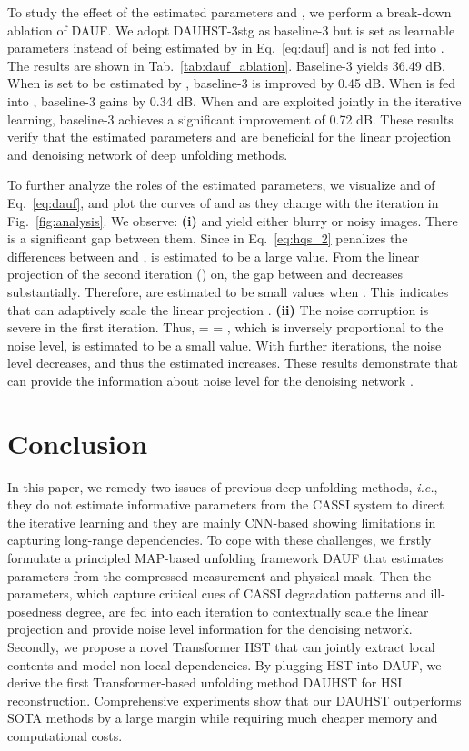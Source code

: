 \documentclass{article}
\begin{document}
To study the effect of the estimated parameters  and , we perform a break-down ablation of DAUF. We adopt DAUHST-3stg as baseline-3 but  is set as learnable parameters instead of being estimated by  in Eq.~\eqref{eq:dauf} and   is not fed into . 
The results are shown in Tab.~\ref{tab:dauf_ablation}. Baseline-3 yields 36.49 dB. When  is set to be estimated by , baseline-3 is improved by 0.45 dB. When  is fed into , baseline-3 gains by 0.34 dB. When  and  are exploited jointly in the iterative learning, baseline-3 achieves a significant improvement of 0.72 dB. These results verify that the estimated parameters  and  are beneficial for the linear projection and denoising network of deep unfolding methods.

To further analyze the roles of the estimated parameters, we visualize  and  of Eq.~\eqref{eq:dauf}, and plot the curves of  and  as they change with the iteration in Fig.~\ref{fig:analysis}. We observe: \textbf{(i)}  and  yield either blurry or noisy images. There is a significant gap between them. Since   in Eq.~\eqref{eq:hqs_2} penalizes the differences between  and ,  is estimated to be a large value. From the linear projection of the second iteration () on, the gap between  and  decreases substantially. Therefore,  are estimated to be small values when . This indicates that  can adaptively scale the linear projection . \textbf{(ii)} The noise corruption is severe in the first iteration. Thus,  =  = , which is inversely proportional to the noise level, is estimated to be a small value. With further iterations, the noise level decreases, and thus the estimated    increases. These results demonstrate that  can provide the information about noise level  for the denoising network . 



\vspace{-2mm}
\section{Conclusion} 
\vspace{-2mm}
In this paper, we remedy two issues of previous deep unfolding methods, \emph{i.e.}, they do not estimate informative parameters from the CASSI system to direct the iterative learning and they are mainly CNN-based showing limitations in capturing long-range dependencies. To cope with  these challenges, we firstly formulate a principled MAP-based unfolding framework DAUF that estimates parameters from the compressed measurement and physical mask. Then the parameters, which capture critical cues of CASSI degradation patterns and ill-posedness degree, are fed into each iteration to contextually scale the linear projection and provide noise level information for the denoising network. Secondly, we propose a novel Transformer HST that can jointly extract local contents and model non-local dependencies. By plugging HST into DAUF, we derive the first Transformer-based unfolding method DAUHST for HSI reconstruction. Comprehensive experiments show that our DAUHST outperforms SOTA methods by a large margin while requiring much cheaper memory and computational costs. 

{
	
	
}
\end{document}
